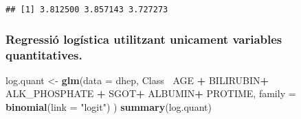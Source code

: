 \documentclass[]{article}
\newenvironment{Shaded}{\begin{snugshade}}{\end{snugshade}}
\newcommand{\DataTypeTok}[1]{\textcolor[rgb]{0.13,0.29,0.53}{#1}}
\newcommand{\KeywordTok}[1]{\textcolor[rgb]{0.13,0.29,0.53}{\textbf{#1}}}
\newcommand{\NormalTok}[1]{#1}
\newcommand{\OperatorTok}[1]{\textcolor[rgb]{0.81,0.36,0.00}{\textbf{#1}}}
\newcommand{\StringTok}[1]{\textcolor[rgb]{0.31,0.60,0.02}{#1}}
\begin{document}
\begin{Shaded}
\end{Shaded}

\begin{verbatim}
## [1] 3.812500 3.857143 3.727273
\end{verbatim}

\hypertarget{regressiuxf3-loguxedstica-utilitzant-unicament-variables-quantitatives.}{%
\subsubsection{Regressió logística utilitzant unicament variables
quantitatives.}\label{regressiuxf3-loguxedstica-utilitzant-unicament-variables-quantitatives.}}

\begin{Shaded}
\begin{Highlighting}[]
\NormalTok{log.quant <-}\StringTok{ }\KeywordTok{glm}\NormalTok{(}\DataTypeTok{data =}\NormalTok{ dhep, Class}\OperatorTok{~}\StringTok{ }\NormalTok{AGE }\OperatorTok{+}\StringTok{ }\NormalTok{BILIRUBIN}\OperatorTok{+}\StringTok{ }\NormalTok{ALK_PHOSPHATE }\OperatorTok{+}\StringTok{ }\NormalTok{SGOT}\OperatorTok{+}\StringTok{ }\NormalTok{ALBUMIN}\OperatorTok{+}\StringTok{ }\NormalTok{PROTIME, }
                 \DataTypeTok{family =} \KeywordTok{binomial}\NormalTok{(}\DataTypeTok{link =} \StringTok{"logit"}\NormalTok{) )}
\KeywordTok{summary}\NormalTok{(log.quant)}
\end{Highlighting}
\end{Shaded}
\end{document}
